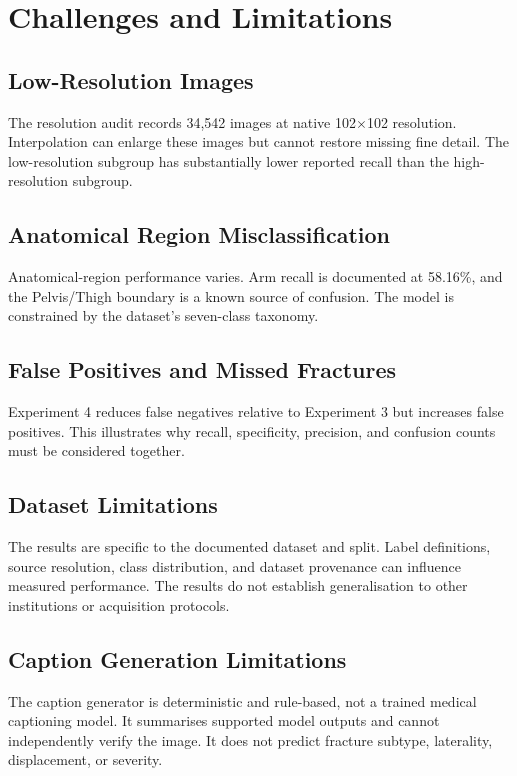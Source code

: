 \documentclass{article}
\begin{document}
\section{Challenges and Limitations}

\subsection{Low-Resolution Images}
The resolution audit records 34,542 images at native 102$\times$102 resolution. Interpolation can enlarge these images but cannot restore missing fine detail. The low-resolution subgroup has substantially lower reported recall than the high-resolution subgroup.

\subsection{Anatomical Region Misclassification}
Anatomical-region performance varies. Arm recall is documented at 58.16\%, and the Pelvis/Thigh boundary is a known source of confusion. The model is constrained by the dataset's seven-class taxonomy.

\subsection{False Positives and Missed Fractures}
Experiment 4 reduces false negatives relative to Experiment 3 but increases false positives. This illustrates why recall, specificity, precision, and confusion counts must be considered together.

\subsection{Dataset Limitations}
The results are specific to the documented dataset and split. Label definitions, source resolution, class distribution, and dataset provenance can influence measured performance. The results do not establish generalisation to other institutions or acquisition protocols.

\subsection{Caption Generation Limitations}
The caption generator is deterministic and rule-based, not a trained medical captioning model. It summarises supported model outputs and cannot independently verify the image. It does not predict fracture subtype, laterality, displacement, or severity.
\end{document}
